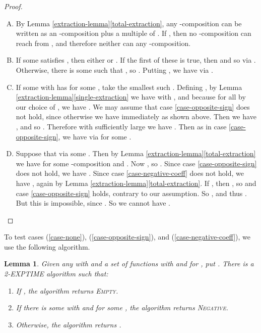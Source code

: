 \documentclass[11pt]{amsart}
\newtheorem{lemma}{Lemma}
\theoremstyle{definition}
\theoremstyle{remark}
\begin{document}
\begin{proof}
\begin{enumerate}[(A)]
\item By Lemma \ref{extraction-lemma}\ref{total-extraction}, any -composition can be written as an -composition plus a multiple of . If , then no -composition can reach  from , and therefore neither can any -composition.
\item If some  satisfies , then either  or . If the first of these is true, then  and so  via . Otherwise, there is some  such that , so . Putting , we have  via .
\item If some  with  has  for some , take the smallest such . Defining , by Lemma \ref{extraction-lemma}\ref{single-extraction} we have  with , and because  for all  by our choice of , we have . We may assume that case \ref{case-opposite-sign} does not hold, since otherwise we have  immediately as shown above. Then we have , and so . Therefore with  sufficiently large we have . Then as in case \ref{case-opposite-sign}, we have  via  for some .
\item Suppose that  via some . Then by Lemma \ref{extraction-lemma}\ref{total-extraction} we have  for some -composition  and . Now , so . Since case \ref{case-opposite-sign} does not hold, we have . Since case \ref{case-negative-coeff} does not hold, we have , again by Lemma \ref{extraction-lemma}\ref{total-extraction}. If , then , so  and case \ref{case-opposite-sign} holds, contrary to our assumption. So , and thus . But this is impossible, since . So we cannot have . \qedhere
\end{enumerate}
\end{proof}

To test cases (\ref{case-none}), (\ref{case-opposite-sign}), and (\ref{case-negative-coeff}), we use the following algorithm.

\begin{lemma} \label{largest-mod-reachable}
Given any  with  and a set  of functions  with  and  for , put . There is a \textsf{2-EXPTIME} algorithm such that:
\begin{enumerate}
\item If , the algorithm returns \textsc{Empty}.
\item If there is some  with  and  for some , the algorithm returns \textsc{Negative}.
\item Otherwise, the algorithm returns .
\end{enumerate}
\end{lemma}
\end{document}

